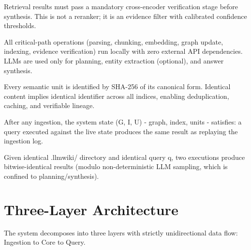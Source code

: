 \begin{designprinciple}
Retrieval results must pass a mandatory cross-encoder verification stage before synthesis. This is not a reranker; it is an evidence filter with calibrated confidence thresholds.
\end{designprinciple}

\begin{designprinciple}
All critical-path operations (parsing, chunking, embedding, graph update, indexing, evidence verification) run locally with zero external API dependencies. LLMs are used only for planning, entity extraction (optional), and answer synthesis.
\end{designprinciple}

\begin{designprinciple}
Every semantic unit is identified by SHA-256 of its canonical form. Identical content implies identical identifier across all indices, enabling deduplication, caching, and verifiable lineage.
\end{designprinciple}

\begin{designprinciple}
After any ingestion, the system state (G, I, U) - graph, index, units - satisfies: a query executed against the live state produces the same result as replaying the ingestion log.
\end{designprinciple}

\begin{designprinciple}
Given identical .llmwiki/ directory and identical query q, two executions produce bitwise-identical results (modulo non-deterministic LLM sampling, which is confined to planning/synthesis).
\end{designprinciple}

\section{Three-Layer Architecture}
\label{sec:architecture:three-layer}

The system decomposes into three layers with strictly unidirectional data flow: Ingestion to Core to Query.

